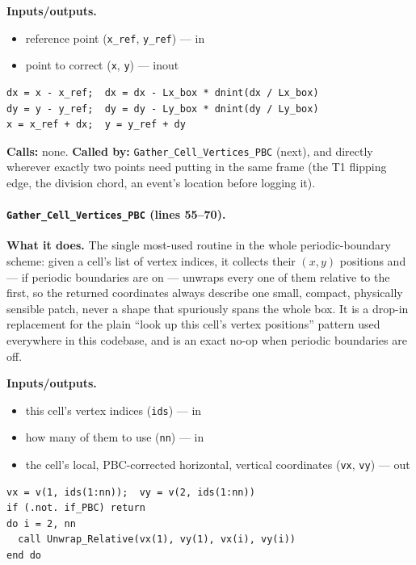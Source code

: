 \documentclass[11pt]{article}
\begin{document}
\textbf{Inputs/outputs.}
\begin{itemize}[nosep]
  \item reference point (\texttt{x\_ref}, \texttt{y\_ref}) --- in
  \item point to correct (\texttt{x}, \texttt{y}) --- inout
\end{itemize}

\begin{lstlisting}[caption={The minimum-image shift computed by \texttt{Unwrap\_Relative}.}]
dx = x - x_ref;  dx = dx - Lx_box * dnint(dx / Lx_box)
dy = y - y_ref;  dy = dy - Ly_box * dnint(dy / Ly_box)
x = x_ref + dx;  y = y_ref + dy
\end{lstlisting}

\textbf{Calls:} none. \textbf{Called by:} \texttt{Gather\_Cell\_Vertices\_PBC} (next),
and directly wherever exactly two points need putting in the same frame (the T1
flipping edge, the division chord, an event's location before logging it).

\paragraph{\texttt{Gather\_Cell\_Vertices\_PBC} (lines 55--70).}
\textbf{What it does.} The single most-used routine in the whole periodic-boundary
scheme: given a cell's list of vertex indices, it collects their $(x,y)$ positions and
--- if periodic boundaries are on --- unwraps every one of them relative to the first,
so the returned coordinates always describe one small, compact, physically sensible
patch, never a shape that spuriously spans the whole box. It is a drop-in replacement
for the plain ``look up this cell's vertex positions'' pattern used everywhere in this
codebase, and is an exact no-op when periodic boundaries are off.

\textbf{Inputs/outputs.}
\begin{itemize}[nosep]
  \item this cell's vertex indices (\texttt{ids}) --- in
  \item how many of them to use (\texttt{nn}) --- in
  \item the cell's local, PBC-corrected horizontal, vertical coordinates (\texttt{vx}, \texttt{vy}) --- out
\end{itemize}

\begin{lstlisting}[caption={\texttt{Gather\_Cell\_Vertices\_PBC}: the drop-in replacement used everywhere a cell's vertices are needed.}]
vx = v(1, ids(1:nn));  vy = v(2, ids(1:nn))
if (.not. if_PBC) return
do i = 2, nn
  call Unwrap_Relative(vx(1), vy(1), vx(i), vy(i))
end do
\end{lstlisting}
\end{document}
